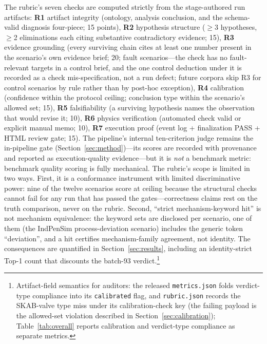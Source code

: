 \documentclass[preprint,10pt]{elsarticle}
\begin{document}
The rubric's seven checks are computed strictly from the stage-authored run artifacts: \textbf{R1} artifact integrity (ontology, analysis conclusion, and the schema-valid diagnosis four-piece; 15 points), \textbf{R2} hypothesis structure ($\ge$3 hypotheses, $\ge$2 eliminations each citing substantive contradictory evidence; 15), \textbf{R3} evidence grounding (every surviving chain cites at least one number present in the scenario's own evidence brief; 20; fault scenarios---the check has no fault-relevant targets in a control brief, and the one control deduction under it is recorded as a check mis-specification, not a run defect; future corpora skip R3 for control scenarios by rule rather than by post-hoc exception), \textbf{R4} calibration (confidence within the protocol ceiling; conclusion type within the scenario's allowed set; 15), \textbf{R5} falsifiability (a surviving hypothesis names the observation that would revise it; 10), \textbf{R6} physics verification (automated check valid or explicit manual memo; 10), \textbf{R7} execution proof (event log + finalization PASS + HTML review gate; 15). The pipeline's internal ten-criterion judge remains the in-pipeline gate (Section~\ref{sec:method})---its scores are recorded with provenance and reported as execution-quality evidence---but it is \emph{not} a benchmark metric: benchmark quality scoring is fully mechanical. The rubric's scope is limited in two ways. First, it is a conformance instrument with limited discriminative power: nine of the twelve scenarios score at ceiling because the structural checks cannot fail for any run that has passed the gates---correctness claims rest on the truth comparison, never on the rubric. Second, ``strict mechanism-keyword hit'' is not mechanism equivalence: the keyword sets are disclosed per scenario, one of them (the IndPenSim process-deviation scenario) includes the generic token ``deviation'', and a hit certifies mechanism-family agreement, not identity. The consequences are quantified in Section~\ref{sec:results}, including an identity-strict Top-1 count that discounts the batch-93 verdict.\footnote{Artifact-field semantics for auditors: the released \texttt{metrics.json} folds verdict-type compliance into its \texttt{calibrated} flag, and \texttt{rubric.json} records the SKAB-valve type miss under its calibration-check key (the failing payload is the allowed-set violation described in Section~\ref{sec:calibration}); Table~\ref{tab:overall} reports calibration and verdict-type compliance as separate metrics.}
\end{document}
